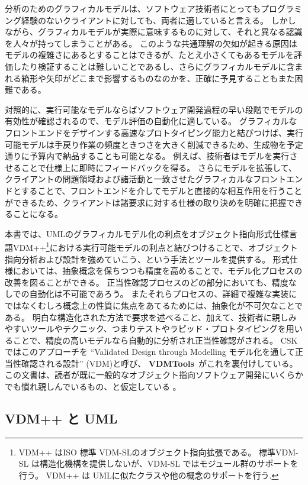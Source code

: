 \documentclass[\pformat,12pt,twoside]{jarticle}
\newcommand{\vdmtools}{\textbf{VDMTools}}
\begin{document}
分析のためのグラフィカルモデルは、ソフトウェア技術者にとってもプログラミング経験のないクライアントに対しても、両者に適していると言える。
しかしながら、グラフィカルモデルが実際に意味するものに対して、それと異なる認識を人々が持ってしまうことがある。
このような共通理解の欠如が起きる原因はモデルの複雑さにあるとすることはできるが、たとえ小さくてもあるモデルを評価したり検証することは難しいことであるし、さらにグラフィカルモデルに含まれる箱形や矢印がどこまで影響するものなのかを、正確に予見することもまた困難である。

対照的に、実行可能なモデルならばソフトウェア開発過程の早い段階でモデルの有効性が確認されるので、モデル評価の自動化に適している。
グラフィカルなフロントエンドをデザインする高速なプロトタイピング能力と結びつけば、実行可能モデルは手戻り作業の頻度ときつさを大きく削減できるため、生成物を予定通りに予算内で納品することも可能となる。
例えば、技術者はモデルを実行させることで仕様上に即時にフィードバックを得る。
さらにモデルを拡張して、クライアントの問題領域および諸活動と一致させたグラフィカルなフロントエンドとすることで、フロントエンドを介してモデルと直接的な相互作用を行うことができるため、クライアントは諸要求に対する仕様の取り決めを明確に把握できることになる。

本書では、UMLのグラフィカルモデル化の利点をオブジェクト指向形式仕様言語VDM++\footnote{{\small
VDM++ はISO 標準 VDM-SLのオブジェクト指向拡張である。
標準VDM-SL は構造化機構を提供しないが、VDM-SL
ではモジュール群のサポートを行う。  VDM++ は UMLに似たクラスや他の概念のサポートを行う}.}における実行可能モデルの利点と結びつけることで、オブジェクト指向分析および設計を強めていこう、という手法とツールを提供する。
 形式仕様においては、抽象概念を保ちつつも精度を高めることで、モデル化プロセスの改善を図ることができる。
正当性確認プロセスのどの部分においても、精度なしでの自動化は不可能であろう。
またそれらプロセスの、詳細で複雑な実装にではなくむしろ概念上の性質に焦点をあてるためには、抽象化が不可欠なことである。
明白な構造化された方法で要求を述べること、加えて、技術者に親しみやすいツールやテクニック、つまりテストやラピッド・プロトタイピングを用いることで、精度の高いモデルなら自動的に分析され正当性確認がされる。
CSK ではこのアプローチを ``Validated Design through Modelling モデル化を通して正当性確認される設計'' (VDM)と呼び、 \vdmtools\ がこれを裏付けしている。
この文書は、読者が既に一般的なオブジェクト指向ソフトウェア開発にいくらかでも慣れ親しんでいるもの、と仮定している \cite{Meyer88,Shlaer88,Rumbaugh&91}。

\subsection{VDM++ と UML}
\end{document}

